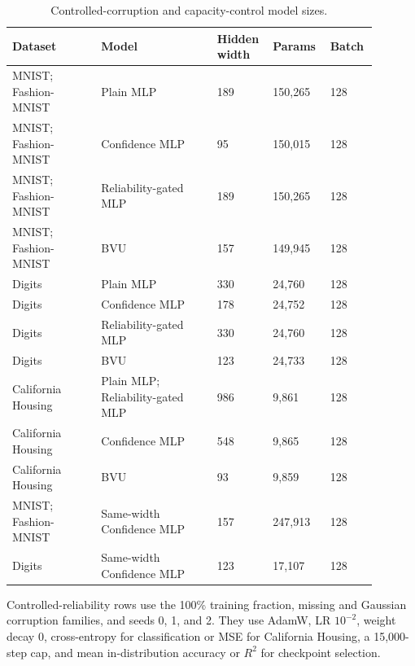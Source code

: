 \begin{table}[t]
\centering
\caption{Controlled-corruption and capacity-control model sizes.}
\begin{tabular}{@{}p{0.23\linewidth}p{0.30\linewidth}p{0.12\linewidth}p{0.14\linewidth}p{0.10\linewidth}@{}}
\toprule
Dataset & Model & Hidden width & Params & Batch \\
\midrule
MNIST; Fashion-MNIST & Plain MLP & 189 & 150,265 & 128 \\
MNIST; Fashion-MNIST & Confidence MLP & 95 & 150,015 & 128 \\
MNIST; Fashion-MNIST & Reliability-gated MLP & 189 & 150,265 & 128 \\
MNIST; Fashion-MNIST & BVU & 157 & 149,945 & 128 \\
Digits & Plain MLP & 330 & 24,760 & 128 \\
Digits & Confidence MLP & 178 & 24,752 & 128 \\
Digits & Reliability-gated MLP & 330 & 24,760 & 128 \\
Digits & BVU & 123 & 24,733 & 128 \\
California Housing & Plain MLP; Reliability-gated MLP & 986 & 9,861 & 128 \\
California Housing & Confidence MLP & 548 & 9,865 & 128 \\
California Housing & BVU & 93 & 9,859 & 128 \\
MNIST; Fashion-MNIST & Same-width Confidence MLP & 157 & 247,913 & 128 \\
Digits & Same-width Confidence MLP & 123 & 17,107 & 128 \\
\bottomrule
\end{tabular}
\parbox{0.98\linewidth}{\footnotesize Controlled-reliability rows use the 100\% training fraction, missing and Gaussian corruption families, and seeds 0, 1, and 2. They use AdamW, LR $10^{-2}$, weight decay 0, cross-entropy for classification or MSE for California Housing, a 15,000-step cap, and mean in-distribution accuracy or $R^2$ for checkpoint selection.}
\end{table}

